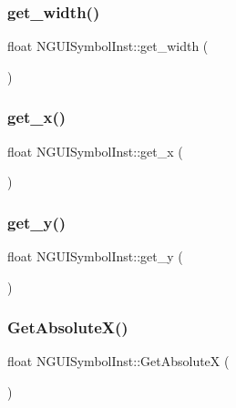 \subsubsection{\texorpdfstring{get\+\_\+width()}{get\_width()}}
{\footnotesize\ttfamily float N\+G\+U\+I\+Symbol\+Inst\+::get\+\_\+width (\begin{DoxyParamCaption}{ }\end{DoxyParamCaption})}

\hypertarget{class_n_g_u_i_symbol_inst_a87825fddf6c5bbc15aef8feb6f031c71}{}\label{class_n_g_u_i_symbol_inst_a87825fddf6c5bbc15aef8feb6f031c71} 
\subsubsection{\texorpdfstring{get\+\_\+x()}{get\_x()}}
{\footnotesize\ttfamily float N\+G\+U\+I\+Symbol\+Inst\+::get\+\_\+x (\begin{DoxyParamCaption}{ }\end{DoxyParamCaption})}

\hypertarget{class_n_g_u_i_symbol_inst_a1949207136dd7dcff46d03bca3d2a3c3}{}\label{class_n_g_u_i_symbol_inst_a1949207136dd7dcff46d03bca3d2a3c3} 
\subsubsection{\texorpdfstring{get\+\_\+y()}{get\_y()}}
{\footnotesize\ttfamily float N\+G\+U\+I\+Symbol\+Inst\+::get\+\_\+y (\begin{DoxyParamCaption}{ }\end{DoxyParamCaption})}

\hypertarget{class_n_g_u_i_symbol_inst_a30b841d2e266152cec974f707e3cd64e}{}\label{class_n_g_u_i_symbol_inst_a30b841d2e266152cec974f707e3cd64e} 
\subsubsection{\texorpdfstring{Get\+Absolute\+X()}{GetAbsoluteX()}}
{\footnotesize\ttfamily float N\+G\+U\+I\+Symbol\+Inst\+::\+Get\+AbsoluteX (\begin{DoxyParamCaption}{ }\end{DoxyParamCaption})}


